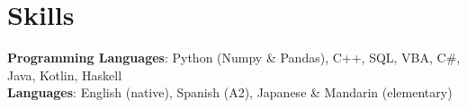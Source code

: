 \section{Skills}
\begin{itemize}[leftmargin=0.15in, label={}]
\small{\item{
    \textbf{Programming Languages}{: Python (Numpy \& Pandas), C++, SQL, VBA, C#, Java, Kotlin, Haskell} \\
    \textbf{Languages}{: English (native), Spanish (A2), Japanese \& Mandarin (elementary)} \\
}}
\end{itemize}
